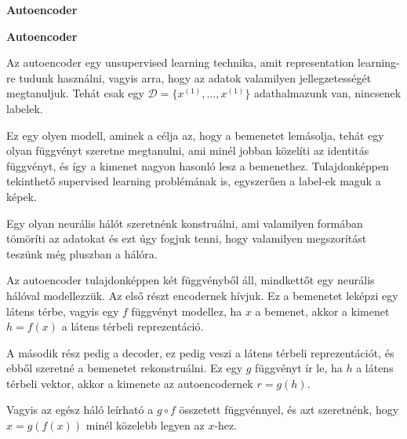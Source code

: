 \documentclass[12pt]{amsart}
\begin{document}
\begin{center}
\textbf{Autoencoder}
\end{center}

\vspace{20pt}

\textbf{Autoencoder}

\vspace{10pt}

Az autoencoder egy unsupervised learning technika, amit
representation learning-re tudunk használni, vagyis arra,
hogy az adatok valamilyen jellegzetességét
megtanuljuk. Tehát csak egy $\mathcal{D} = \{x^{(1)}, \dots,
x^{(1)} \}$ adathalmazunk van, nincsenek labelek.

\vspace{5pt}

Ez egy olyen modell, aminek a célja az, hogy a bemenetet
lemásolja, tehát egy olyan függvényt szeretne megtanulni,
ami minél jobban közelíti az identitás függvényt, és így a
kimenet nagyon hasonló lesz a bemenethez. Tulajdonképpen
tekinthető supervised learning problémának is, egyszerűen a
label-ek maguk a képek. 

\vspace{5pt}

Egy olyan neurális hálót szeretnénk konstruálni, ami
valamilyen formában tömöríti az adatokat és ezt úgy fogjuk
tenni, hogy valamilyen megszorítást teszünk még pluszban a
hálóra. 

\vspace{5pt}

Az autoencoder tulajdonképpen két függvényből áll,
mindkettőt egy neurális hálóval modellezzük. Az első részt
encodernek hívjuk. Ez a bemenetet leképzi egy látens térbe,
vagyis egy $f$ függvényt modellez, ha $x$ a bemenet,
akkor a kimenet $h = f(x)$ a látens térbeli
reprezentáció.

\vspace{5pt}

A második rész pedig a decoder, ez pedig veszi a látens
térbeli reprezentációt, és ebből szeretné a bemenetet
rekonstruálni. Ez egy $g$ függvényt ír le, ha $h$ a látens
térbeli vektor, akkor a kimenete az autoencodernek $r =
g(h)$.

\vspace{5pt}

Vagyis az egész háló leírható a $g\circ f$ összetett
függvénnyel, és azt szeretnénk, hogy $\hat{x} = g(f(x))$
minél közelebb legyen az $x$-hez.

\vspace{5pt}
\end{document}
